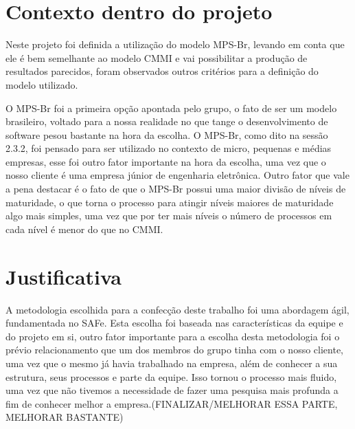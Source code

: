   \section{Contexto dentro do projeto}
Neste projeto foi definida a utilização do modelo MPS-Br, levando em conta que ele é bem semelhante ao modelo CMMI e vai possibilitar a produção de resultados parecidos, foram observados outros critérios para a definição do modelo utilizado.

O MPS-Br foi a primeira opção apontada pelo grupo, o fato de ser um modelo brasileiro, voltado para a nossa realidade no que tange o desenvolvimento de software pesou bastante na hora da escolha. O MPS-Br, como dito na sessão 2.3.2, foi pensado para ser utilizado no contexto de micro, pequenas e médias empresas, esse foi outro fator importante na hora da escolha, uma vez que o nosso cliente é uma empresa júnior de engenharia eletrônica. Outro fator que vale a pena destacar é o fato de que o MPS-Br possui uma maior divisão de níveis de maturidade, o que torna o processo para atingir níveis maiores de maturidade algo mais simples, uma vez que por ter mais níveis o número de processos em cada nível é menor do que no CMMI.

  \section{Justificativa}
A metodologia escolhida para a confecção deste trabalho foi uma abordagem ágil, fundamentada no SAFe. Esta escolha foi baseada nas características da equipe e do projeto em si, outro fator importante para a escolha desta metodologia foi o prévio relacionamento que um dos membros do grupo tinha com o nosso cliente, uma vez que o mesmo já havia trabalhado na empresa, além de conhecer a sua estrutura, seus processos e parte da equipe. Isso tornou o processo mais fluido, uma vez que não tivemos a necessidade de fazer uma pesquisa mais profunda a fim de conhecer melhor a empresa.(FINALIZAR/MELHORAR ESSA PARTE, MELHORAR BASTANTE)